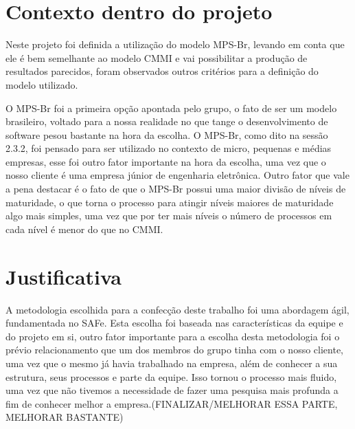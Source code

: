   \section{Contexto dentro do projeto}
Neste projeto foi definida a utilização do modelo MPS-Br, levando em conta que ele é bem semelhante ao modelo CMMI e vai possibilitar a produção de resultados parecidos, foram observados outros critérios para a definição do modelo utilizado.

O MPS-Br foi a primeira opção apontada pelo grupo, o fato de ser um modelo brasileiro, voltado para a nossa realidade no que tange o desenvolvimento de software pesou bastante na hora da escolha. O MPS-Br, como dito na sessão 2.3.2, foi pensado para ser utilizado no contexto de micro, pequenas e médias empresas, esse foi outro fator importante na hora da escolha, uma vez que o nosso cliente é uma empresa júnior de engenharia eletrônica. Outro fator que vale a pena destacar é o fato de que o MPS-Br possui uma maior divisão de níveis de maturidade, o que torna o processo para atingir níveis maiores de maturidade algo mais simples, uma vez que por ter mais níveis o número de processos em cada nível é menor do que no CMMI.

  \section{Justificativa}
A metodologia escolhida para a confecção deste trabalho foi uma abordagem ágil, fundamentada no SAFe. Esta escolha foi baseada nas características da equipe e do projeto em si, outro fator importante para a escolha desta metodologia foi o prévio relacionamento que um dos membros do grupo tinha com o nosso cliente, uma vez que o mesmo já havia trabalhado na empresa, além de conhecer a sua estrutura, seus processos e parte da equipe. Isso tornou o processo mais fluido, uma vez que não tivemos a necessidade de fazer uma pesquisa mais profunda a fim de conhecer melhor a empresa.(FINALIZAR/MELHORAR ESSA PARTE, MELHORAR BASTANTE)